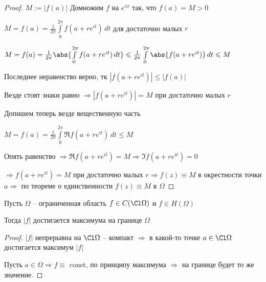 \begin{proof}\thmslashn
	
	$M:= |f(a)|$ Домножим $f$ на $e^{i\phi}$ так, что $f(a) = M > 0$
	
	$M = f(a) = \frac{1}{2\pi}\int\limits_0^{2\pi} f(a + re^{it})\,dt$ для достаточно малых $r$
	
	$M = f(a) = \frac{1}{2\pi}\abs{\int\limits_0^{2\pi} f(a + re^{it})\,dt} \leqslant \frac{1}{2\pi}\int\limits_0^{2\pi} \abs{f(a + re^{it})}\,dt \leqslant M$ 
	
	Последнее неравенство верно, тк $|f(a + re^{it})| \leqslant |f(a)|$
	
	Везде стоят знаки равно $\Rightarrow |f(a + re^{it})| = M$ при достаточно малых $r$
	
	Допишем теперь везде вещественную часть 
	
	$M = f(a) = \frac{1}{2\pi}\int\limits_0^{2\pi} \Re f(a + re^{it})\,dt \leqslant M$
	
	Опять равенство $\Rightarrow \Re f(a+re^{it}) = M \Rightarrow \Im f(a+re^{it}) = 0$
	
	$\Rightarrow f(a+re^{it}) = M$ при достаточно малых $r \Rightarrow f(z) \equiv M$ в окрестности точки $a \Rightarrow$ по теореме о единственности $f(z) \equiv M$ в $\Omega$
	
\end{proof}

\begin{consequence}\thmslashn
	
	Пусть $\Omega$ -- ограниченная область $f\in C(\Cl \Omega)$ и $f \in H(\Omega)$
	
	Тогда $|f|$ достигается максимума на границе $\Omega$
	
\end{consequence}

\begin{proof}\thmslashn
	
	$|f|$ непрерывна на $\Cl \Omega$ -- компакт $\Rightarrow$ в какой-то точке $a \in \Cl \Omega$ достигается максимум $|f|$
	
	Пусть $a \in \Omega \Rightarrow f \equiv$ const, по принципу максимума $\Rightarrow$ на границе будет то же значение. 
	
\end{proof}